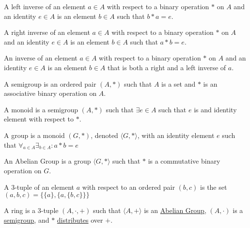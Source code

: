 \documentclass[crop=false,class=book]{standalone}
\begin{document}
\begin{definition}
\label{Definition:MathEnc:Analysis:Sum:LeftInverse}
A left inverse of an element $a\in A$ with respect to a binary operation $*$
on $A$ and an identity $e\in A$ is an element $b\in A$ such that $b*a=e$.
\end{definition}
\begin{definition}
\label{Definition:MathEnc:Analysis:Sum:RightInverse}
A right inverse of an element $a\in A$ with respect to a binary operation $*$
on $A$ and an identity $e\in A$ is an element $b\in A$ such that $a*b=e$.
\end{definition}
\begin{definition}
\label{Definition:MathEnc:Analysis:Sum:Inverse}
An inverse of an element $a\in A$ with respect to a binary operation $*$
on $A$ and an identity $e\in A$ is an element $b\in A$ that is both a right
and a left inverse of $a$.
\end{definition}
\begin{definition}
\label{Definition:MathEnc:Analysis:Sum:Semigroup}
A semigroup is an ordered pair $(A,*)$ such that $A$ is a set and $*$ is an
associative binary operation on $A$.
\end{definition}
\begin{definition}
\label{Definition:MathEnc:Analysis:Sum:Monoid}
A monoid is a semigroup $(A,*)$ such that $\exists e\in A$ such that $e$ is
and identity element with respect to $*$.
\end{definition}
\begin{definition}
\label{Definition:MathEnc:Analysis:Sum:Group}
A group is a monoid $(G,*)$, denoted $\langle G,*\rangle$, with an identity
element $e$ such that $\forall_{a\in A}\exists_{b\in A}:a*b=e$ 
\end{definition}
\begin{definition}
\label{Definition:MathEnc:Analysis:Sum:AbelianGroup}
An Abelian Group is a group $\langle G,*\rangle$ such that $*$ is a
commutative binary operation on $G$.
\end{definition}
\begin{definition}
\label{Definition:MathEnc:Analysis:Sum:3Tuple}
A 3-tuple of an element $a$ with respect to an ordered pair $(b,c)$ is the
set $(a,b,c)=\{\{a\},\{a,\{b,c\}\}\}$
\end{definition}
\begin{definition}
\label{Definition:MathEnc:Analysis:Sum:Ring}
A ring is a 3-tuple $(A,\cdot,+)$ such that $\langle A,+\rangle$ is an
\hyperref[Definition:MathEnc:Analysis:Sum:AbelianGroup]{Abelian Group},
$(A,\cdot)$ is a
\hyperref[Definition:MathEnc:Analysis:Sum:Semigroup]{semigroup}, and $*$
\hyperref[Definition:MathEnc:Analysis:Sum:Distribute]{distributes} over $+$.
\end{definition}
\end{document}
